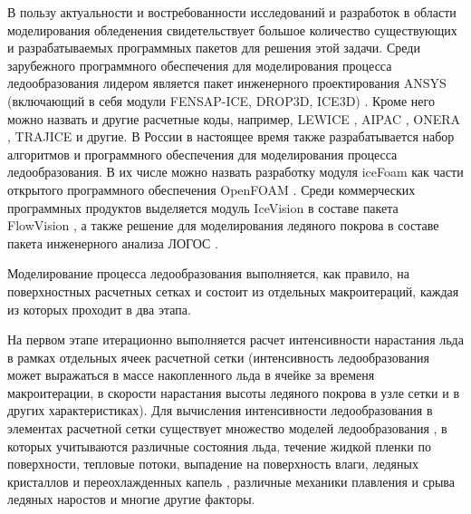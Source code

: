 В пользу актуальности и востребованности исследований и разработок в области моделирования обледенения свидетельствует большое количество существующих и разрабатываемых программных пакетов для решения этой задачи.
Среди зарубежного программного обеспечения для моделирования процесса ледообразования лидером является пакет инженерного проектирования ANSYS (включающий в себя модули FENSAP-ICE, DROP3D, ICE3D) \cite{Martini2022IntroIce}.
Кроме него можно назвать и другие расчетные коды, например, LEWICE \cite{Shannon2019IntroIce}, AIPAC \cite{Domingos2015IceHeat}, ONERA \cite{Villedieu2014IntroIce}, TRAJICE \cite{Son2010IntroIce} и другие.
В России в настоящее время также разрабатывается набор алгоритмов и программного обеспечения для моделирования процесса ледообразования.
В их числе можно назвать разработку модуля iceFoam как части открытого программного обеспечения OpenFOAM \cite{Koshelev2020Ice}.
Среди коммерческих программных продуктов выделяется модуль IceVision в составе пакета FlowVision \cite{Sorokin2020Ice}, а также решение для моделирования ледяного покрова в составе пакета инженерного анализа ЛОГОС \cite{Galanov2021IntroIce}.

Моделирование процесса ледообразования выполняется, как правило, на поверхностных расчетных сетках и состоит из отдельных макроитераций, каждая из которых проходит в два этапа.

На первом этапе итерационно выполняется расчет интенсивности нарастания льда в рамках отдельных ячеек расчетной сетки (интенсивность ледообразования может выражаться в массе накопленного льда в ячейке за временя макроитерации, в скорости нарастания высоты ледяного покрова в узле сетки и в других характеристиках).
Для вычисления интенсивности ледообразования в элементах расчетной сетки существует множество моделей ледообразования \cite{Bartkus2018IntroIce,Zhang2017IntroIce,Pena2016IntroIce}, в которых учитываются различные состояния льда, течение жидкой пленки по поверхности, тепловые потоки, выпадение на поверхность влаги, ледяных кристаллов и переохлажденных капель \cite{Wang2023IntroIce,Liu2022IntroIce}, различные механики плавления и срыва ледяных наростов \cite{Ruan2023IntroIce} и многие другие факторы. 


